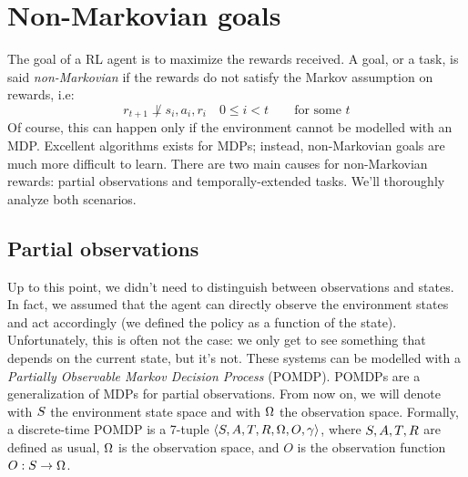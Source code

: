 \section{Non-Markovian goals}
\label{sec:non-markov}

The goal of a RL agent is to maximize the rewards received.  A goal, or a
task, is said \emph{non-Markovian} if the rewards do not satisfy the Markov
assumption on rewards, i.e:
\begin{equation}
	r_{t+1} \not\perp s_i, a_i, r_i \quad 0 \le i < t \qquad \text{for some $t$}
	\label{eq:markov-rewards}
\end{equation}
Of course, this can happen only if the environment cannot be modelled with an
MDP. Excellent algorithms exists for MDPs; instead, non-Markovian goals are
much more difficult to learn.  There are two main causes for non-Markovian
rewards: partial observations and temporally-extended tasks. We'll thoroughly
analyze both scenarios.


\subsection{Partial observations}

Up to this point, we didn't need to distinguish between observations and
states. In fact, we assumed that the agent can directly observe the
environment states and act accordingly (we defined the policy as a function of
the state). Unfortunately, this is often not the case: we only get to see
something that depends on the current state, but it's not. These systems can
be modelled with a \emph{Partially Observable Markov Decision Process}
(POMDP).  POMDPs are a generalization of MDPs for partial observations. From
now on, we will denote with $S$ the environment state space and with
$\Omega$ the observation space. Formally, a discrete-time POMDP is a 7-tuple
${\langle S, A, T, R, \Omega, O, \gamma \rangle}$, where $S, A,
T, R$ are defined as usual, $\Omega$ is the observation space, and $O$ is the
observation function ${O: S \to \Omega}$.

